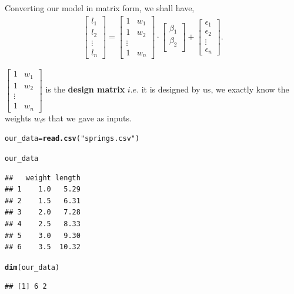 \documentclass[11pt, a4paper]{article}\usepackage[]{graphicx}\usepackage[]{xcolor}
\makeatletter
\newcommand{\hlstr}[1]{\textcolor[rgb]{0.192,0.494,0.8}{#1}}%
\newcommand{\hlstd}[1]{\textcolor[rgb]{0.345,0.345,0.345}{#1}}%
\newcommand{\hlkwb}[1]{\textcolor[rgb]{0.69,0.353,0.396}{#1}}%
\newcommand{\hlkwd}[1]{\textcolor[rgb]{0.737,0.353,0.396}{\textbf{#1}}}%
\newenvironment{kframe}{%
 \def\at@end@of@kframe{}%
 \ifinner\ifhmode%
  \def\at@end@of@kframe{\end{minipage}}%
  \begin{minipage}{\columnwidth}%
 \fi\fi%
 \def\FrameCommand##1{\hskip\@totalleftmargin \hskip-\fboxsep
 \colorbox{shadecolor}{##1}\hskip-\fboxsep
     \hskip-\linewidth \hskip-\@totalleftmargin \hskip\columnwidth}%
 \MakeFramed {\advance\hsize-\width
   \@totalleftmargin\z@ \linewidth\hsize
   \@setminipage}}%
 {\par\unskip\endMakeFramed%
 \at@end@of@kframe}
\newenvironment{knitrout}{}{} %
\makeatother
\begin{document}
Converting our model in matrix form, we shall have,
\begin{gather}
	\begin{bmatrix} l_1 \\	l_2 \\	\vdots \\	l_n	\end{bmatrix}
	=
	\begin{bmatrix}	1 & w_1 \\	1 & w_2 \\	\vdots \\	1 & w_n	\end{bmatrix} 
	\cdot
	\begin{bmatrix}	\beta_1 \\	\beta_2 \\	\end{bmatrix}  
	+	
	\begin{bmatrix}  \epsilon_1 \\	\epsilon_2 \\	\vdots \\	\epsilon_n	\end{bmatrix}.
\end{gather}

$ \begin{bmatrix}	1 & w_1 \\	1 & w_2 \\	\vdots \\	1 & w_n	\end{bmatrix} $ is the \textbf{design matrix} $i.e.$ it is designed by us, we exactly know the weights $w_i$s that we gave as inputs.

\begin{knitrout}
\color{fgcolor}\begin{kframe}
\begin{alltt}
\hlstd{our_data} \hlkwb{=} \hlkwd{read.csv}\hlstd{(}\hlstr{"springs.csv"}\hlstd{)}

\hlstd{our_data}
\end{alltt}
\begin{verbatim}
##   weight length
## 1    1.0   5.29
## 2    1.5   6.31
## 3    2.0   7.28
## 4    2.5   8.33
## 5    3.0   9.30
## 6    3.5  10.32
\end{verbatim}
\begin{alltt}
\hlkwd{dim}\hlstd{(our_data)}
\end{alltt}
\begin{verbatim}
## [1] 6 2
\end{verbatim}
\end{kframe}
\end{knitrout}
\end{document}

